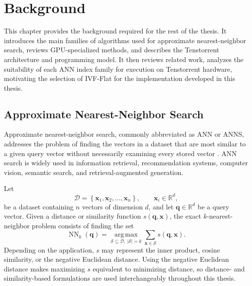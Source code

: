 \chapter{Background}
\label{chap:background}

This chapter provides the background required for the rest of the thesis. It introduces the main families of algorithms used for approximate nearest-neighbor search, reviews GPU-specialized methods, and describes the Tenstorrent architecture and programming model. It then reviews related work, analyzes the suitability of each ANN index family for execution on Tenstorrent hardware, motivating the selection of IVF-Flat for the implementation developed in this thesis.

\section{Approximate Nearest-Neighbor Search}
\label{sec:ann}

Approximate nearest-neighbor search, commonly abbreviated as ANN or ANNS, addresses the problem of finding the vectors in a dataset that are most similar to a given query vector without necessarily examining every stored vector \cite{faiss,hnsw}. ANN search is widely used in information retrieval, recommendation systems, computer vision, semantic search, and retrieval-augmented generation.

Let
\begin{equation}
\mathcal{D}=\left\{\mathbf{x}_1,\mathbf{x}_2,\ldots,\mathbf{x}_n\right\}, \qquad \mathbf{x}_i\in\mathbb{R}^{d},
\end{equation}
be a dataset containing \(n\) vectors of dimension \(d\), and let \(\mathbf{q}\in\mathbb{R}^{d}\) be a query vector. Given a distance or similarity function \(s(\mathbf{q},\mathbf{x})\), the exact \(k\)-nearest-neighbor problem consists of finding the set
\begin{equation}
\operatorname{NN}_k(\mathbf{q})=\underset{\mathcal{S}\subseteq\mathcal{D},\,\lvert\mathcal{S}\rvert=k}{\operatorname{arg\,max}}\sum_{\mathbf{x}\in\mathcal{S}}s(\mathbf{q},\mathbf{x}).
\end{equation}
Depending on the application, \(s\) may represent the inner product, cosine similarity, or the negative Euclidean distance. Using the negative Euclidean distance makes maximizing \(s\) equivalent to minimizing distance, so distance- and similarity-based formulations are used interchangeably throughout this thesis.

